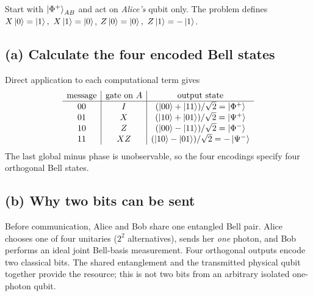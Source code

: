 
Start with \(\left\lvert \Phi^+\right\rangle_{AB}\) and act on
\emph{Alice's} qubit only. The problem defines
\(X\left\lvert 0\right\rangle=\left\lvert 1\right\rangle,\ X\left\lvert 1\right\rangle=\left\lvert 0\right\rangle\),
\(Z\left\lvert 0\right\rangle=\left\lvert 0\right\rangle,\ Z\left\lvert 1\right\rangle=-\left\lvert 1\right\rangle\).

\subsection*{(a) Calculate the four encoded Bell states}
Direct application to each computational term gives
\[
\begin{array}{c|c|c}
\text{message}&\text{gate on }A&\text{output state}\\\hline
00&I&(\left\lvert 00\right\rangle+\left\lvert 11\right\rangle)/\sqrt2=\left\lvert \Phi^+\right\rangle\\
01&X&(\left\lvert 10\right\rangle+\left\lvert 01\right\rangle)/\sqrt2=\left\lvert \Psi^+\right\rangle\\
10&Z&(\left\lvert 00\right\rangle-\left\lvert 11\right\rangle)/\sqrt2=\left\lvert \Phi^-\right\rangle\\
11&XZ&(\left\lvert 10\right\rangle-\left\lvert 01\right\rangle)/\sqrt2=-\left\lvert \Psi^-\right\rangle
\end{array}
\]
The last global minus phase is unobservable, so
the four encodings specify four orthogonal Bell states.

\subsection*{(b) Why two bits can be sent}
Before communication, Alice and Bob share
one entangled Bell pair. Alice chooses one
of four unitaries (\(2^2\) alternatives), sends
her \emph{one} photon, and Bob performs an
ideal joint Bell-basis measurement.
Four orthogonal outputs encode two classical bits.
The shared entanglement and the transmitted
physical qubit together provide the resource;
this is not two bits from an arbitrary isolated
one-photon qubit.

